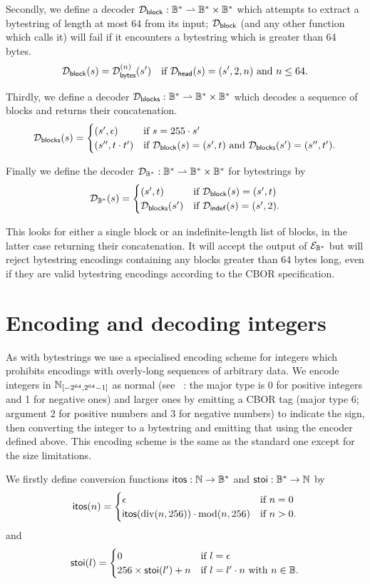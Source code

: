 \noindent Secondly, we define a decoder $\mathcal{D}_{\mathsf{block}}: \mathbb{B}^* \rightharpoonup \mathbb{B}^*
\times \mathbb{B}^*$ which attempts to extract a bytestring of length at most 64
from its input; $\mathcal{D}_{\mathsf{block}}$ (and any other function which calls it) will
fail if it encounters a bytestring which is greater than 64 bytes.
$$
\mathcal{D}_{\mathsf{block}}(s) =
  \mathcal{D}_{\mathsf{bytes}}^{(n)}(s') \quad \text{if $\mathcal{D}_{\mathsf{head}}(s) = (s', 2,n)$ and $n \leq 64$}.
$$

\noindent Thirdly, we define a decoder $\mathcal{D}_{\mathsf{blocks}}: \mathbb{B}^* \rightharpoonup \mathbb{B}^*
\times \mathbb{B}^*$ which decodes a sequence of blocks and returns their concatenation.
$$
\mathcal{D}_{\mathsf{blocks}}(s) =
\begin{cases}
  (s', \epsilon) & \text{if $s = 255 \cdot s'$}\\
  (s'', t \cdot t') &
  \text{if $\mathcal{D}_{\mathsf{block}}(s) = (s', t)$
    and $\mathcal{D}_{\mathsf{blocks}}(s') = (s'', t')$}.
\end{cases}
$$

\noindent Finally we define the decoder $\mathcal{D}_{\mathbb{B}^*}: \mathbb{B}^* \rightharpoonup \mathbb{B}^*
\times \mathbb{B}^*$ for bytestrings by
$$
\mathcal{D}_{\mathbb{B}^*}(s) =
\begin{cases}
  (s', t) & \text{if $\mathcal{D}_{\mathsf{block}}(s) = (s', t)$}\\
  \mathcal{D}_{\mathsf{blocks}}(s') & \text{if $\mathcal{D}_{\mathsf{indef}}(s) = (s', 2)$}.
\end{cases}
$$

\noindent This looks for either a single block or an indefinite-length list of
blocks, in the latter case returning their concatenation.  It will accept the
output of $\mathcal{E}_{\mathbb{B}^*}$ but will reject bytestring encodings containing any blocks
greater than 64 bytes long, even if they are valid bytestring encodings
according to the CBOR specification.

\section{Encoding and decoding integers}
As with bytestrings we use a specialised encoding scheme for integers which
prohibits encodings with overly-long sequences of arbitrary data.  We encode
integers in $\mathbb{N}_{[-2^{64},2^{64}-1]}$ as normal (see ~\cite[\S
  3.1]{rfc8949-CBOR}: the major type is 0 for positive integers and 1 for
negative ones) and larger ones by emitting a CBOR tag (major type 6; argument 2
for positive numbers and 3 for negative numbers) to indicate the sign, then
converting the integer to a bytestring and emitting that using the encoder
defined above.  This encoding scheme is the same as the standard one except for
the size limitations.

\medskip
\noindent
We firstly define conversion functions $\mathsf{itos} : \mathbb{N} \rightarrow
\mathbb{B}^*$ and $\mathsf{stoi}: \mathbb{B}^* \rightarrow \mathbb{N}$ by
$$
\mathsf{itos}(n) =
\begin{cases}
  \epsilon & \text{if $n=0$}\\
  \mathsf{itos}(\operatorname{div}(n,256)) \cdot \operatorname{mod}(n,256) & \text{if $n>0$.}\\
\end{cases}
$$
\noindent and
$$
\mathsf{stoi}(l) =
\begin{cases}
  0 & \text{if $l = \epsilon$}\\
  256\times\mathsf{stoi}(l') + n & \text{if $l=l' \cdot n$ with $n \in \mathbb{B}$.}\\
\end{cases}
$$

